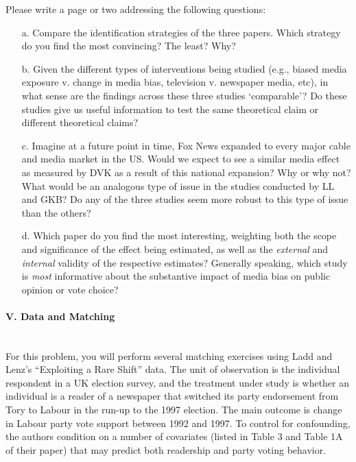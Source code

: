 \documentclass{article}
\begin{document}
\vspace{1em}

Please write a page or two addressing the following questions:


   \begin{itemize}
   \item[a.]  Compare the identification strategies of the
     three papers.  Which strategy do you find the most convincing?
     The least?  Why?

   \item[b.] Given the different types of interventions being studied
     (e.g., biased media exposure v. change in media bias, television v. newspaper media,
     etc), in what sense are the findings across these three studies
     `comparable'?  Do these studies give us useful information to
     test the same theoretical claim or different theoretical claims?  

   \item[c.] Imagine at a future point in time, Fox News expanded to
    every major cable and media market in the US. Would we 
     expect to see a similar media effect as measured by DVK as a
     result of this national expansion?  Why or why
    not?  What would be an analogous type of issue in the studies
    conducted by LL and GKB?  Do any of the three studies seem more
    robust to this type of issue than the others?

   \item[d.]  Which paper do you find the most 
     interesting, weighting both the scope and significance of the
     effect being estimated, as well as the {\em external} and {\em internal} validity
     of the respective estimates?  Generally speaking, which study is
     {\em most} informative about the substantive impact of media bias on 
public opinion or vote choice?  


\end{itemize}




\paragraph{\Large V. Data and Matching \\ \\}

For this problem, you will perform several matching exercises using
Ladd and Lenz's ``Exploiting a Rare Shift'' data.  The unit of
observation is the individual respondent in a UK election survey, and
the treatment under study is whether an individual is a reader of a
newspaper that switched its party endorsement from Tory to Labour in
the run-up to the 1997 election.  The main outcome is change in Labour
party vote support between 1992 and 1997.  To control for confounding,
the authors condition on a number of covariates (listed in Table 3
and Table 1A of their paper) that may predict both readership and party voting
behavior.
\\
\end{document}
